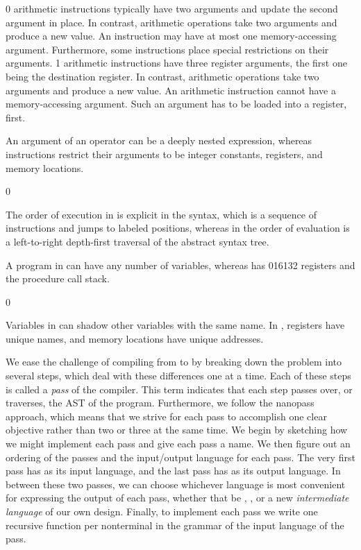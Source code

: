 \documentclass[7x10]{TimesAPriori_MIT}%
\def\racketEd{0}
\def\edition{1}
\def\xeightysixEd{0}
\def\riscvEd{1}
\def\architecture{1}
\newcommand\ifriscv[1]{\if\architecture\riscvEd{#1}\fi}
\newcommand\ifxeightsix[1]{\if\architecture\xeightysixEd{#1}\fi}
\numberwithin{theorem}{chapter}
\numberwithin{definition}{chapter}
\numberwithin{equation}{chapter}
\begin{document}
\begin{enumerate}
\item
\if\architecture\xeightysixEd
  {\ArchName} arithmetic instructions typically have two arguments and
  update the second argument in place. In contrast, \LangVar{}
  arithmetic operations take two arguments and produce a new value.
  An {\ArchName} instruction may have at most one memory-accessing argument.
  Furthermore, some {\ArchName} instructions place special restrictions on
  their arguments.
\fi
\if\architecture\riscvEd
  {\ArchName} arithmetic instructions have three register arguments,
  the first one being the destination register. In contrast, \LangVar{}
  arithmetic operations take two arguments and produce a new value.
  An {\ArchName} arithmetic instruction cannot have a memory-accessing
  argument. Such an argument has to be loaded into a register, first.
\fi

\item An argument of an \LangVar{} operator can be a deeply nested
  expression, whereas {\ArchName} instructions restrict their arguments to be
  integer constants, registers, and memory locations.

{\if\edition\racketEd      
\item The order of execution in {\ArchName} is explicit in the syntax, which
  is a sequence of instructions and jumps to labeled positions,
  whereas in \LangVar{} the order of evaluation is a left-to-right
  depth-first traversal of the abstract syntax tree.  \fi}

\item A program in \LangVar{} can have any number of variables,
  whereas {\ArchName} has \ifxeightsix{16}\ifriscv{32} registers and the procedure call stack.
{\if\edition\racketEd    
\item Variables in \LangVar{} can shadow other variables with the
  same name. In {\ArchName}, registers have unique names, and memory locations
  have unique addresses.
\fi}  
\end{enumerate}

We ease the challenge of compiling from \LangVar{} to {\ArchName} by breaking
down the problem into several steps, which deal with these differences
one at a time. Each of these steps is called a \emph{pass} of the
compiler.
%
This term indicates that each step passes over, or traverses, the AST
of the program.
%
Furthermore, we follow the nanopass approach, which means that we
strive for each pass to accomplish one clear objective rather than two
or three at the same time.
%
We begin by sketching how we might implement each pass and give each
pass a name.  We then figure out an ordering of the passes and the
input/output language for each pass. The very first pass has
\LangVar{} as its input language, and the last pass has \LangXInt{} as
its output language. In between these two passes, we can choose
whichever language is most convenient for expressing the output of
each pass, whether that be \LangVar{}, \LangXInt{}, or a new
\emph{intermediate language} of our own design.  Finally, to
implement each pass we write one recursive function per nonterminal in
the grammar of the input language of the pass.
\end{document}
